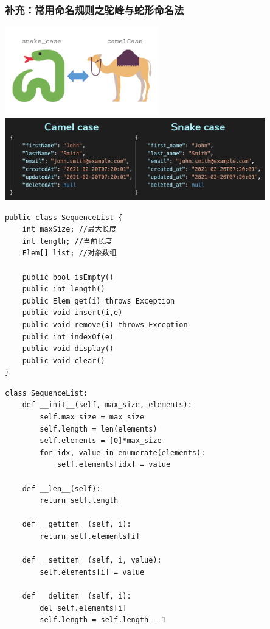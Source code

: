 \begin{frame}[fragile]
  \frametitle{补充：常用命名规则之驼峰与蛇形命名法}
  \begin{center}
    \includegraphics[width=0.5\textwidth]{figs/list/snake_case_camel_case.png}
    \includegraphics[width=0.85\textwidth]{figs/list/snake_vs_camel.jpg}
  \end{center}
\end{frame}

\begin{frame}[fragile]
  \begin{verbatim}
public class SequenceList {
    int maxSize; //最大长度
    int length; //当前长度
    Elem[] list; //对象数组

    public bool isEmpty()
    public int length()
    public Elem get(i) throws Exception
    public void insert(i,e)
    public void remove(i) throws Exception
    public int indexOf(e)
    public void display()
    public void clear()
}
  \end{verbatim}
\end{frame}

\begin{frame}[fragile]
  \begin{verbatim}
class SequenceList:
    def __init__(self, max_size, elements):
        self.max_size = max_size
        self.length = len(elements)
        self.elements = [0]*max_size
        for idx, value in enumerate(elements):
            self.elements[idx] = value

    def __len__(self):
        return self.length

    def __getitem__(self, i):
        return self.elements[i]

    def __setitem__(self, i, value):
        self.elements[i] = value

    def __delitem__(self, i):
        del self.elements[i]
        self.length = self.length - 1
  \end{verbatim}
\end{frame}

